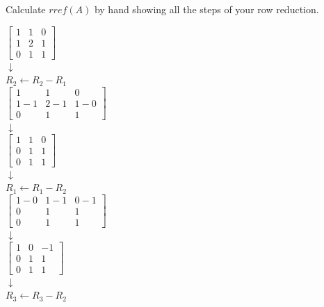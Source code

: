 \documentclass[12pt,letterpaper, onecolumn]{exam}
\begin{document}
\begin{questions}
    
    \question Calculate $rref(A)$ by hand showing all the steps of your row reduction.
    \begin{solution}
        \begin{center}
            $\begin{bmatrix}
                1 & 1 & 0 \\
                1 & 2 & 1 \\
                0 & 1 & 1
            \end{bmatrix}$
            \\$\downarrow$\\
            $R_2 \leftarrow R_2 - R_1$\\
            $\begin{bmatrix}
                1 & 1 & 0 \\
                1 - 1 & 2 - 1 & 1 - 0 \\
                0 & 1 & 1
            \end{bmatrix}$
            \\$\downarrow$\\
            $\begin{bmatrix}
                1 & 1 & 0 \\
                0 & 1 & 1 \\
                0 & 1 & 1
            \end{bmatrix}$
            \\$\downarrow$\\
            $R_1 \leftarrow R_1 - R_2$\\
            $\begin{bmatrix}
                1 - 0 & 1 - 1 & 0 - 1 \\
                0 & 1 & 1 \\
                0 & 1 & 1
            \end{bmatrix}$
            \\$\downarrow$\\
            $\begin{bmatrix}
                1 & 0 & -1 \\
                0 & 1 & 1 \\
                0 & 1 & 1
            \end{bmatrix}$
            \\$\downarrow$\\
            $R_3 \leftarrow R_3 - R_2$\\

\end{center}
\end{solution}
\end{questions}
\end{document}

